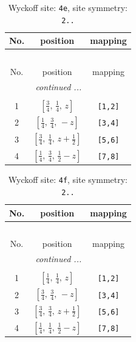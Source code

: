 \documentclass[fleqn,8pt]{jsarticle}
\begin{document}
\renewcommand{\arraystretch}{1.2}
\begin{longtable}{ccc}
\caption{Wyckoff site: {\tt 4e}, site symmetry: {\tt 2..}}
 \\
 \hline \hline
No. & position & mapping \\ \hline \endfirsthead

\multicolumn{2}{l}{\tablename\ \thetable{}} \\
 \hline \hline
No. & position & mapping \\ \hline \endhead

 \hline \hline
\multicolumn{2}{r}{\footnotesize\it continued ...} \\ \endfoot

 \hline \hline
\multicolumn{2}{r}{} \\ \endlastfoot

1 & $\left[ \frac{3}{4},\, \frac{1}{4},\, z \right]$ & {\tt [1,2]} \\ \hline
2 & $\left[ \frac{1}{4},\, \frac{3}{4},\, - z \right]$ & {\tt [3,4]} \\ \hline
3 & $\left[ \frac{3}{4},\, \frac{1}{4},\, z + \frac{1}{2} \right]$ & {\tt [5,6]} \\ \hline
4 & $\left[ \frac{1}{4},\, \frac{3}{4},\, \frac{1}{2} - z \right]$ & {\tt [7,8]} \\
\end{longtable}
\renewcommand{\arraystretch}{1.2}
\begin{longtable}{ccc}
\caption{Wyckoff site: {\tt 4f}, site symmetry: {\tt 2..}}
 \\
 \hline \hline
No. & position & mapping \\ \hline \endfirsthead

\multicolumn{2}{l}{\tablename\ \thetable{}} \\
 \hline \hline
No. & position & mapping \\ \hline \endhead

 \hline \hline
\multicolumn{2}{r}{\footnotesize\it continued ...} \\ \endfoot

 \hline \hline
\multicolumn{2}{r}{} \\ \endlastfoot

1 & $\left[ \frac{1}{4},\, \frac{1}{4},\, z \right]$ & {\tt [1,2]} \\ \hline
2 & $\left[ \frac{3}{4},\, \frac{3}{4},\, - z \right]$ & {\tt [3,4]} \\ \hline
3 & $\left[ \frac{3}{4},\, \frac{3}{4},\, z + \frac{1}{2} \right]$ & {\tt [5,6]} \\ \hline
4 & $\left[ \frac{1}{4},\, \frac{1}{4},\, \frac{1}{2} - z \right]$ & {\tt [7,8]} \\
\end{longtable}
\end{document}
